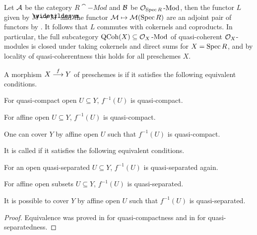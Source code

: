 \documentclass[a4paper,parskip=half,numbers=enddot, DIV=12]{scrreprt}
\begin{document}
Let $\mathcal{A}$ be the category $R\cat{-Mod}$ and $\mathcal{B}$ be $\mathcal{O}_{\operatorname{Spec} R}\operatorname{-Mod}$, then the functor $L$ given by $M\mapsto\snake{M}$ and the functor $\mathcal{M}\mapsto\mathcal{M}(\operatorname{Spec} R)$ are an adjoint pair of functors by . It follows that $L$ commutes with cokernels and coproducts. In particular, the full subcategory $\operatorname{QCoh}(X)\subseteq\mathcal{O}_X\operatorname{-Mod}$ of quasi-coherent $\mathcal{O}_X$-modules is closed under taking cokernels and direct sums for $X=\operatorname{Spec} R$, and by locality of quasi-coherentness this holds for all preschemes $X$.
\begin{defi}
	A morphism $X\morphism[f]Y$ of preschemes is  if it satisfies the following equivalent conditions.
	\begin{alphanumerate}
		\item For quasi-compact open $U\subseteq Y$, $f^{-1}(U)$ is quasi-compact.
		\item For affine open $U\subseteq Y$, $f^{-1}(U)$ is quasi-compact.
		\item One can cover $Y$ by affine open $U$ such that $f^{-1}(U)$ is quasi-compact.
	\end{alphanumerate}
	It is called  if it satisfies the following equivalent conditions.
	\begin{alphanumerate}\setcounter{enumi}{3}
		\item For an open quasi-separated $U\subseteq Y$, $f^{-1}(U)$ is quasi-separated again.
		\item For affine open subsets $U\subseteq Y$, $f^{-1}(U)$ is quasi-separated.
		\item It is possible to cover $Y$ by affine open $U$ such that $f^{-1}(U)$ is quasi-separated.
	\end{alphanumerate}
\end{defi}
\begin{proof}
	Equivalence was proved in \cite[Fact~2.1.1]{alggeo1} for quasi-compactness and in \cite[Lemma~2.1.1]{alggeo1} for quasi-separatedness.
\end{proof}
\end{document}
